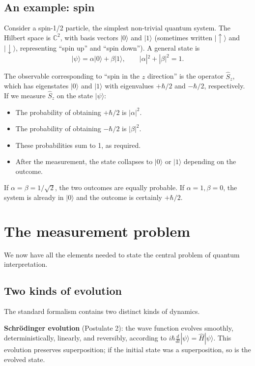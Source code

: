 \subsection{An example: spin}

Consider a spin-1/2 particle, the simplest non-trivial quantum
system. The Hilbert space is $\mathbb{C}^2$, with basis vectors
$|0\rangle$ and $|1\rangle$ (sometimes written $|\uparrow\rangle$
and $|\downarrow\rangle$, representing ``spin up'' and ``spin
down''). A general state is
\[
    |\psi\rangle = \alpha |0\rangle + \beta |1\rangle, \qquad
    |\alpha|^2 + |\beta|^2 = 1.
\]

The observable corresponding to ``spin in the $z$ direction'' is the
operator $\hat{S}_z$, which has eigenstates $|0\rangle$ and
$|1\rangle$ with eigenvalues $+\hbar/2$ and $-\hbar/2$, respectively.
If we measure $\hat{S}_z$ on the state $|\psi\rangle$:

\begin{itemize}[leftmargin=2em]
    \item The probability of obtaining $+\hbar/2$ is $|\alpha|^2$.
    \item The probability of obtaining $-\hbar/2$ is $|\beta|^2$.
    \item These probabilities sum to 1, as required.
    \item After the measurement, the state collapses to $|0\rangle$
    or $|1\rangle$ depending on the outcome.
\end{itemize}

If $\alpha = \beta = 1/\sqrt{2}$, the two outcomes are equally
probable. If $\alpha = 1, \beta = 0$, the system is already in
$|0\rangle$ and the outcome is certainly $+\hbar/2$.

\section{The measurement problem}
\label{sec:measurement}

We now have all the elements needed to state the central problem of
quantum interpretation.

\subsection{Two kinds of evolution}

The standard formalism contains two distinct kinds of dynamics.

\textbf{Schr\"odinger evolution} (Postulate 2): the wave function
evolves smoothly, deterministically, linearly, and reversibly,
according to $i\hbar \frac{d}{dt} |\psi\rangle = \hat{H} |\psi\rangle$.
This evolution preserves superposition; if the initial state was a
superposition, so is the evolved state.

